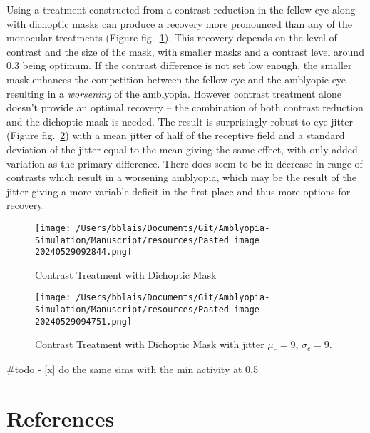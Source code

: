 \documentclass[
]{article}
\begin{document}
Using a treatment constructed from a contrast reduction in the fellow
eye along with dichoptic masks can produce a recovery more pronounced
than any of the monocular treatments (Figure
fig.~\ref{fig:contrast_mask_treatment}). This recovery depends on the
level of contrast and the size of the mask, with smaller masks and a
contrast level around 0.3 being optimum. If the contrast difference is
not set low enough, the smaller mask enhances the competition between
the fellow eye and the amblyopic eye resulting in a \emph{worsening} of
the amblyopia. However contrast treatment alone doesn't provide an
optimal recovery -- the combination of both contrast reduction and the
dichoptic mask is needed. The result is surprisingly robust to eye
jitter (Figure fig.~\ref{fig:contrast_mask_treatment_mu9_sigma_9}) with
a mean jitter of half of the receptive field and a standard deviation of
the jitter equal to the mean giving the same effect, with only added
variation as the primary difference. There does seem to be in decrease
in range of contrasts which result in a worsening amblyopia, which may
be the result of the jitter giving a more variable deficit in the first
place and thus more options for recovery.

\begin{figure}
\centering
\texttt{[image: /Users/bblais/Documents/Git/Amblyopia-Simulation/Manuscript/resources/Pasted image 20240529092844.png]}
\caption{Contrast Treatment with Dichoptic
Mask}\label{fig:contrast_mask_treatment}
\end{figure}

\begin{figure}
\centering
\texttt{[image: /Users/bblais/Documents/Git/Amblyopia-Simulation/Manuscript/resources/Pasted image 20240529094751.png]}
\caption{Contrast Treatment with Dichoptic Mask with jitter \(\mu_c=9\),
\(\sigma_c=9\).}\label{fig:contrast_mask_treatment_mu9_sigma_9}
\end{figure}

\#todo - {[}x{]} do the same sims with the min activity at 0.5

\section*{References}\label{sec:references}
\end{document}
